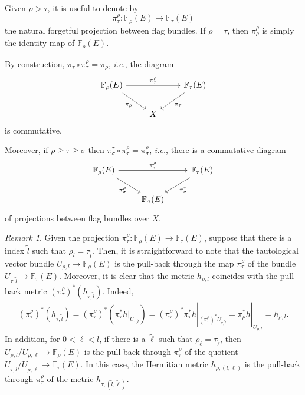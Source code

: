 \documentclass[a4paper]{amsart}
\theoremstyle{plain}%
\theoremstyle{definition}
\theoremstyle{remark}
\newtheorem{remark}[theorem]{Remark}
\newcommand{\FF}{\mathbb{F}}
\begin{document}
Given $ \rho > \tau $, it is useful to denote by
\[
\pi_{\tau}^{\rho} \colon \FF_{\rho}(E) \to \FF_{\tau}(E)
\]
the natural forgetful projection between flag bundles.
If $ \rho = \tau $, then $ \pi_{\rho}^{\rho} $ is simply the identity map of $ \FF_{\rho}(E) $.

By construction, $ \pi_{\tau} \circ \pi_{\tau}^{\rho} = \pi_{\rho} $, \textsl{i.e.}, the diagram
\begin{equation}\label{eq: commutative diagram of incomplete flags over the manifold}
	\begin{tikzcd}
		\FF_{\rho}(E) \arrow[dr, "\pi_{\rho}"'] \arrow[rr," \pi_{\tau}^{\rho}"]{}
		& & \FF_{\tau}(E) \arrow[dl,"\pi_{\tau}"] \\
		& X
	\end{tikzcd}
\end{equation}
is commutative.

Moreover, if $ \rho \ge \tau \ge \sigma $ then $ \pi_{\sigma}^{\tau} \circ \pi_{\tau}^{\rho} = \pi_{\sigma}^{\rho} $, \textsl{i.e.}, there is a commutative diagram
\begin{equation*}
	\begin{tikzcd}
		\FF_{\rho}(E) \arrow[dr, "\pi_{\sigma}^{\rho}"'] \arrow[rr," \pi_{\tau}^{\rho}"]{}
		& & \FF_{\tau}(E) \arrow[dl,"\pi_{\sigma}^{\tau}"] \\
		& \FF_{\sigma}(E)
	\end{tikzcd}
\end{equation*}
of projections between flag bundles over $ X $.

\begin{remark}\label{rem: universal bundles are pull-backs over projections}
	Given the projection $ \pi_{\tau}^{\rho} \colon \FF_{\rho}(E) \to \FF_{\tau}(E) $, suppose that there is a index $ \tilde{l} $ such that $ \rho_l = \tau_{\tilde{l}} $.
	Then, it is straightforward to note that the tautological vector bundle $ U_{\rho,l} \to \FF_{\rho}(E)$ is the pull-back through the map $ \pi_{\tau}^{\rho} $ of the bundle $ U_{\tau,\tilde{l}} \to \FF_{\tau}(E) $.
	Moreover, it is clear that the metric $ h_{\rho,l} $ coincides with the pull-back metric $ (\pi_{\tau}^{\rho})^{*} (h_{\tau,\tilde{l}}) $.
	Indeed,
	\begin{equation*}
		\begin{split}
			(\pi_{\tau}^{\rho})^{*} (h_{\tau,\tilde{l}}) =
			(\pi_{\tau}^{\rho})^{*} \left( { {\pi_{\tau}^{*} h}|_{U_{\tau,\tilde{l}}} } \right) =
			(\pi_{\tau}^{\rho})^{*} {\pi_{\tau}^{*} h}|_{(  \pi_{\tau}^{\rho} )^{*} U_{\tau,\tilde{l}}} =
			{ \pi_{\rho}^{*} h}|_{ U_{\rho,{l}}} =
			h_{\rho,l} .
		\end{split}
	\end{equation*}
	In addition, for $ 0 < \ell < l $, if there is a $ \tilde{\ell} $ such that $ \rho_{\ell} = \tau_{\tilde{\ell}} $, then $ U_{\rho,l}/U_{\rho,\ell} \to \FF_{\rho}(E) $ is the pull-back through $ \pi_{\tau}^{\rho} $ of the quotient $ U_{\tau,\tilde{l}}/U_{\rho,\tilde{\ell}} \to \FF_{\tau}(E) $.
	In this case, the Hermitian metric $ h_{\rho,(l,\ell)} $ is the pull-back through $ \pi_{\tau}^{\rho} $ of the metric $ h_{\tau,(\tilde{l},\tilde{\ell})} $.
\end{remark}
\end{document}
